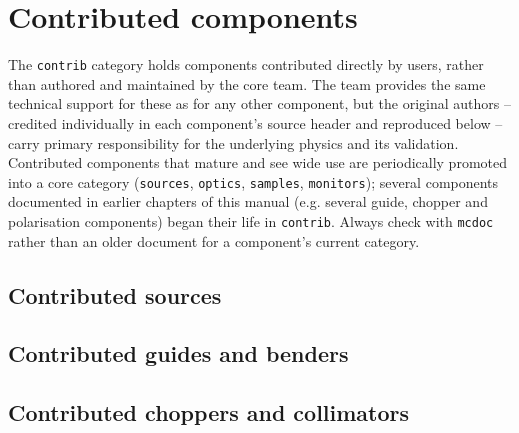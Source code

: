 
\chapter{Contributed components}
\label{c:contrib}

The \texttt{contrib} category holds components contributed directly by
\MCS users, rather than authored and maintained by the core \MCS team.
The \MCS team provides the same technical support for these as for any
other component, but the original authors -- credited individually in each
component's source header and reproduced below -- carry primary
responsibility for the underlying physics and its validation. Contributed
components that mature and see wide use are periodically promoted into a
core category (\texttt{sources}, \texttt{optics}, \texttt{samples},
\texttt{monitors}); several components documented in earlier chapters of
this manual (e.g. several guide, chopper and polarisation components) began
their life in \texttt{contrib}. Always check with \verb+mcdoc+ rather than
an older document for a component's current category.

\section{Contributed sources}









\section{Contributed guides and benders}
















\section{Contributed choppers and collimators}












